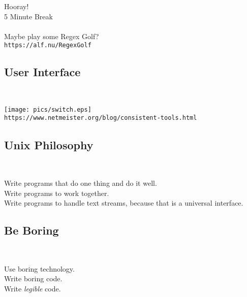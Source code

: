 \documentclass[xga]{xdvislides}
\begin{document}
\newpage
\vspace*{\fill}
\begin{center}
    \Hugesize
        Hooray! \\ [1em]
        5 Minute Break
    \hspace*{5mm}
    \blueline\\
    \hspace*{5mm}\\
	Maybe play some Regex Golf? \\
	\verb+https://alf.nu/RegexGolf+
\end{center}
\vspace*{\fill}

\subsection{User Interface}
\\
\vspace*{\fill}
\begin{center}
	\texttt{[image: pics/switch.eps]} \\
\vspace{.5in}
\verb+https://www.netmeister.org/blog/consistent-tools.html+
\end{center}
\vspace*{\fill}


\subsection{Unix Philosophy}
\\
\Huge
\begin{center}
	Write programs that do one thing and do it well.\\
	\vspace{.5in}
	Write programs to work together. \\
	\vspace{.5in}
	Write programs to handle text streams, because that is a universal interface.
\end{center}
\Normalsize

\subsection{Be Boring}
\\
\Huge
\begin{center}
	Use boring technology. \\
\vspace{1in}
	Write boring code. \\
\vspace{1in}
	Write {\em legible} code.
\end{center}
\Normalsize
\end{document}
